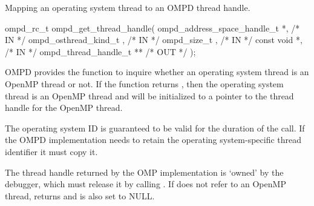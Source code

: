 %
%
%
%
%
%
%


\summary
Mapping an operating system thread to an OMPD thread handle.
\format
\ccppspecificstart
\begin{boxedcode}
ompd\_rc\_t ompd\_get\_thread\_handle(
  ompd\_address\_space\_handle\_t   *,                            /* IN */
  ompd\_osthread\_kind\_t           ,                              /* IN */
  ompd\_size\_t                    ,                   /* IN */
  const void                    *,                          /* IN */
  ompd\_thread\_handle\_t         **                     /* OUT */
);
\end{boxedcode}
\ccppspecificend

\descr
OMPD provides the function 
to inquire whether an operating system thread is an OpenMP
thread or not.
If the function returns , then the operating
system thread is an OpenMP thread and 
will be initialized to a pointer to the thread handle for
the OpenMP thread.

\argdesc

The operating system ID  is guaranteed
to be valid for the duration of the call.
If the OMPD implementation needs to retain the operating system-specific
thread identifier it must copy it.

The thread handle  returned by the OMP implementation
is `owned' by the debugger, which must release it by calling
.
If  does not refer to an OpenMP thread,
 returns 
and  is also set to NULL.
\crossreferences


